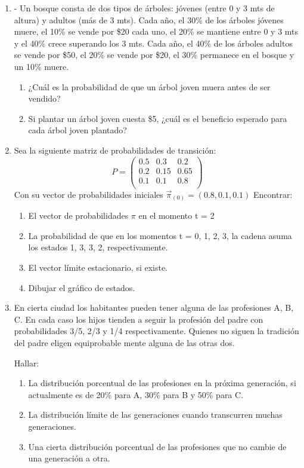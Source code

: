 \documentclass{templateNote}
\begin{document}
\begin{enumerate}
    \newpage
    \item - Un bosque consta de dos tipos de árboles: jóvenes (entre 0 y 3 mts de altura) y adultos (más
    de 3 mts). Cada año, el 30\% de los árboles jóvenes muere, el 10\% se vende por \$20 cada uno,
    el 20\% se mantiene entre 0 y 3 mts y el 40\% crece superando los 3 mts. Cada año, el 40\% de
    los árboles adultos se vende por \$50, el 20\% se vende por \$20, el 30\% permanece en el bosque
    y un 10\% muere.
    \begin{enumerate}[label=\alph*)]
        \item ¿Cuál es la probabilidad de que un árbol joven muera antes de ser vendido?
        \item Si plantar un árbol joven cuesta \$5, ¿cuál es el beneficio esperado para cada árbol joven plantado?
    \end{enumerate}


    \newpage
    \item Sea la siguiente matriz de probabilidades de transición: 
    \[
    P = \begin{pmatrix}
        0.5 & 0.3   & 0.2 \\
        0.2 & 0.15  & 0.65 \\
        0.1 & 0.1   & 0.8 \\
    \end{pmatrix}
    \]
    Con su vector de probabilidades iniciales $\vec{\pi}_{(0)} = (0.8,0.1,0.1)$
    Encontrar:
    \begin{enumerate}[label=\alph*)]
        \item El vector de probabilidades $\pi$ en el momento t = 2
        \item La probabilidad de que en los momentos t = 0, 1, 2, 3, la cadena asuma los estados 1, 3, 3, 2, respectivamente.
        \item El vector límite estacionario, si existe. 
        \item Dibujar el gráfico de estados.
    \end{enumerate}


    \newpage
    \item En cierta ciudad los habitantes pueden tener alguna de las profesiones A, B, C. En cada
    caso los hijos tienden a seguir la profesión del padre con probabilidades 3/5, 2/3 y 1/4
    respectivamente. Quienes no siguen la tradición del padre eligen equiprobable mente
    alguna de las otras dos.

    Hallar:

    \begin{enumerate}[label=\alph*)]
        \item La distribución porcentual de las profesiones en la próxima generación, si actualmente es de 20\% para A, 30\% para B y 50\% para C.
        \item La distribución límite de las generaciones cuando transcurren muchas generaciones. 
        \item Una cierta distribución porcentual de las profesiones que no cambie de una generación a otra.
    \end{enumerate}



\end{enumerate}
\end{document}
